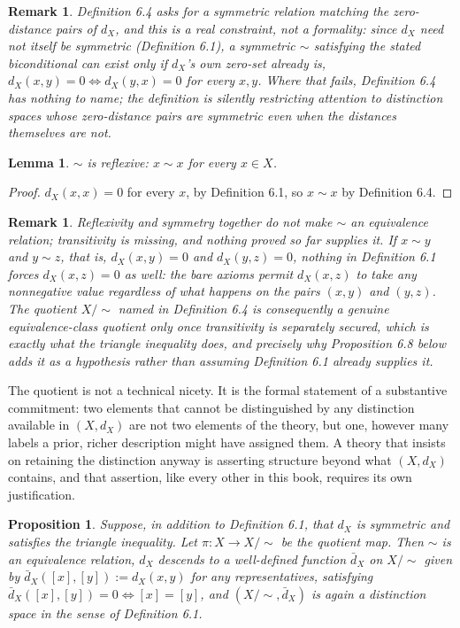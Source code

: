 \documentclass[11pt]{book}
\newtheorem{lemma}[theorem]{Lemma}
\newtheorem{proposition}[theorem]{Proposition}
\newtheorem{remark}[theorem]{Remark}
\begin{document}
\begin{remark}
Definition 6.4 asks for a symmetric relation matching the zero-distance pairs of $d_X$, and this is a real constraint, not a formality: since $d_X$ need not itself be symmetric (Definition 6.1), a symmetric $\sim$ satisfying the stated biconditional can exist only if $d_X$'s own zero-set already is, $d_X(x,y)=0 \iff d_X(y,x)=0$ for every $x,y$. Where that fails, Definition 6.4 has nothing to name; the definition is silently restricting attention to distinction spaces whose zero-distance pairs are symmetric even when the distances themselves are not.
\end{remark}

\begin{lemma}
$\sim$ is reflexive: $x \sim x$ for every $x \in X$.
\end{lemma}

\begin{proof}
$d_X(x,x) = 0$ for every $x$, by Definition 6.1, so $x \sim x$ by Definition 6.4.
\end{proof}

\begin{remark}
Reflexivity and symmetry together do not make $\sim$ an equivalence relation; transitivity is missing, and nothing proved so far supplies it. If $x \sim y$ and $y \sim z$, that is, $d_X(x,y) = 0$ and $d_X(y,z) = 0$, nothing in Definition 6.1 forces $d_X(x,z) = 0$ as well: the bare axioms permit $d_X(x,z)$ to take any nonnegative value regardless of what happens on the pairs $(x,y)$ and $(y,z)$. The quotient $X/\!\sim$ named in Definition 6.4 is consequently a genuine equivalence-class quotient only once transitivity is separately secured, which is exactly what the triangle inequality does, and precisely why Proposition 6.8 below adds it as a hypothesis rather than assuming Definition 6.1 already supplies it.
\end{remark}

The quotient is not a technical nicety. It is the formal statement of a substantive commitment: two elements that cannot be distinguished by any distinction available in $(X, d_X)$ are not two elements of the theory, but one, however many labels a prior, richer description might have assigned them. A theory that insists on retaining the distinction anyway is asserting structure beyond what $(X, d_X)$ contains, and that assertion, like every other in this book, requires its own justification.

\begin{proposition}
Suppose, in addition to Definition 6.1, that $d_X$ is symmetric and satisfies the triangle inequality. Let $\pi : X \to X/\!\sim$ be the quotient map. Then $\sim$ is an equivalence relation, $d_X$ descends to a well-defined function $\bar d_X$ on $X/\!\sim$ given by $\bar d_X([x],[y]) := d_X(x,y)$ for any representatives, satisfying $\bar d_X([x],[y]) = 0 \iff [x] = [y]$, and $(X/\!\sim, \bar d_X)$ is again a distinction space in the sense of Definition 6.1.
\end{proposition}
\end{document}
